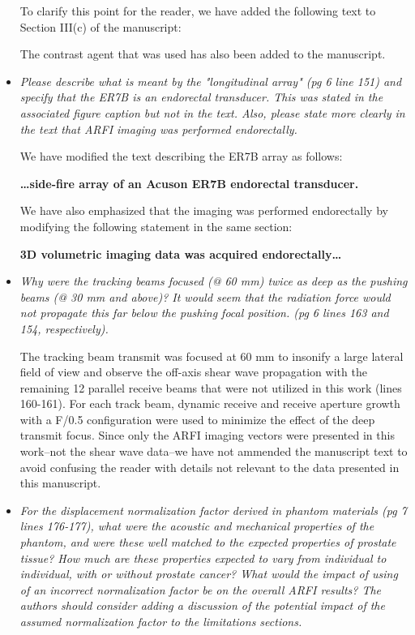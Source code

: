 \documentclass[10pt]{article}
\begin{document}
\begin{itemize}
    To clarify this point for the reader, we have added the following text to
    Section III(c) of the manuscript:

    \textbf{}

    The contrast agent that was used has also been added to the manuscript.

    \item \textit{Please describe what is meant by the "longitudinal array" (pg
            6 line 151) and specify that the ER7B is an endorectal transducer.
            This was stated in the associated figure caption but not in the
            text.  Also, please state more clearly in the text that ARFI
            imaging was performed endorectally.}

    We have modified the text describing the ER7B array as follows:

    \textbf{\ldots side-fire array of an Acuson ER7B endorectal transducer.}

    We have also emphasized that the imaging was performed endorectally by
    modifying the following statement in the same section:

    \textbf{3D volumetric imaging data was acquired endorectally\ldots}

    \item \textit{Why were the tracking beams focused (@ 60 mm) twice as deep
            as the pushing beams (@ 30 mm and above)?  It would seem that the
            radiation force would not propagate this far below the pushing
            focal position. (pg 6 lines 163 and 154, respectively).}

    The tracking beam transmit was focused at 60 mm to insonify a large lateral
    field of view and observe the off-axis shear wave propagation with the
    remaining 12 parallel receive beams that were not utilized in this work
    (lines 160-161). For each track beam, dynamic receive and receive aperture
    growth with a F/0.5 configuration were used to minimize the effect of the
    deep transmit focus.  Since only the ARFI imaging vectors were presented in
    this work--not the shear wave data--we have not ammended the manuscript
    text to avoid confusing the reader with details not relevant to the data
    presented in this manuscript.

    \item \textit{For the displacement normalization factor derived in phantom
            materials (pg 7 lines 176-177), what were the acoustic and
            mechanical properties of the phantom, and were these well matched
            to the expected properties of prostate tissue?  How much are these
            properties expected to vary from individual to individual, with or
            without prostate cancer?  What would the impact of using of an
            incorrect normalization factor be on the overall ARFI results?  The
            authors should consider adding a discussion of the potential impact
            of the assumed normalization factor to the limitations sections.}


\end{itemize}
\end{document}
